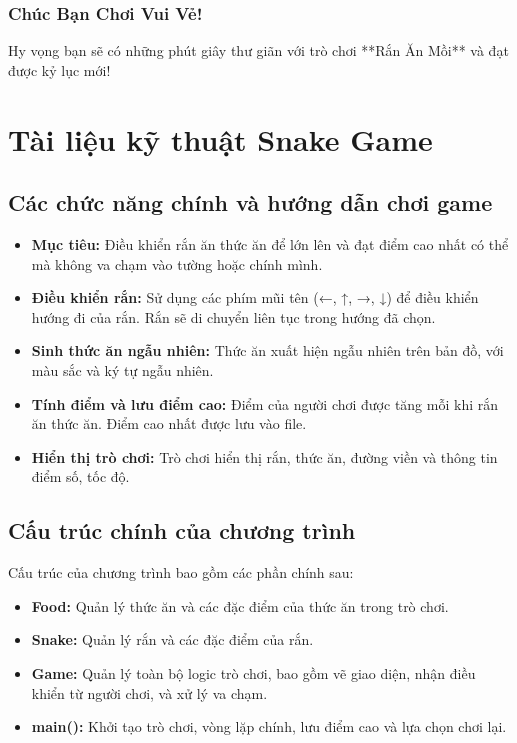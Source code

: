 \documentclass[a4paper,12pt]{article}
\begin{document}
\subsubsection*{Chúc Bạn Chơi Vui Vẻ!}
Hy vọng bạn sẽ có những phút giây thư giãn với trò chơi **Rắn Ăn Mồi** và đạt được kỷ lục mới!


\newpage
\section{Tài liệu kỹ thuật Snake Game}

\subsection{Các chức năng chính và hướng dẫn chơi game}
\begin{itemize}
    \item \textbf{Mục tiêu:} Điều khiển rắn ăn thức ăn để lớn lên và đạt điểm cao nhất có thể mà không va chạm vào tường hoặc chính mình.
    \item \textbf{Điều khiển rắn:} Sử dụng các phím mũi tên (←, ↑, →, ↓) để điều khiển hướng đi của rắn. Rắn sẽ di chuyển liên tục trong hướng đã chọn.
    \item \textbf{Sinh thức ăn ngẫu nhiên:} Thức ăn xuất hiện ngẫu nhiên trên bản đồ, với màu sắc và ký tự ngẫu nhiên.
    \item \textbf{Tính điểm và lưu điểm cao:} Điểm của người chơi được tăng mỗi khi rắn ăn thức ăn. Điểm cao nhất được lưu vào file.
    \item \textbf{Hiển thị trò chơi:} Trò chơi hiển thị rắn, thức ăn, đường viền và thông tin điểm số, tốc độ.
\end{itemize}

\subsection{Cấu trúc chính của chương trình}
Cấu trúc của chương trình bao gồm các phần chính sau:
\begin{itemize}
    \item \textbf{Food:} Quản lý thức ăn và các đặc điểm của thức ăn trong trò chơi.
    \item \textbf{Snake:} Quản lý rắn và các đặc điểm của rắn.
    \item \textbf{Game:} Quản lý toàn bộ logic trò chơi, bao gồm vẽ giao diện, nhận điều khiển từ người chơi, và xử lý va chạm.
    \item \textbf{main():} Khởi tạo trò chơi, vòng lặp chính, lưu điểm cao và lựa chọn chơi lại.
\end{itemize}
\end{document}
